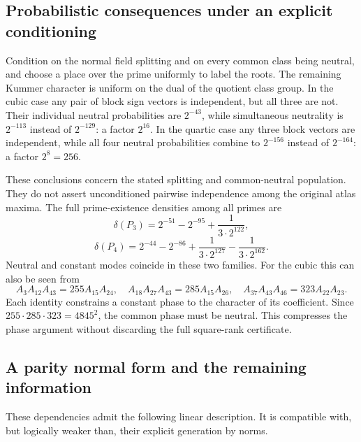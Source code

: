 \documentclass[11pt]{article}
\theoremstyle{definition}\newtheorem{definition}[theorem]{Definition}
\begin{document}
\subsection{Probabilistic consequences under an explicit conditioning}
Condition on the normal field splitting and on every common class
being neutral, and choose a place over the prime uniformly to label
the roots. The remaining Kummer character is uniform on the dual
of the quotient class group. In the cubic case any pair of
block sign vectors is independent, but all three are not. Their
individual neutral probabilities are $2^{-43}$, while simultaneous
neutrality is $2^{-113}$ instead of $2^{-129}$: a factor $2^{16}$.
In the quartic case any three block vectors are independent, while
all four neutral probabilities combine to $2^{-156}$ instead of
$2^{-164}$: a factor $2^8=256$.

These conclusions concern the stated splitting and common-neutral
population. They do not assert unconditioned pairwise independence
among the original atlas maxima. The full prime-existence densities
among all primes are
\[
 \delta(P_3)=2^{-51}-2^{-95}+\frac1{3\cdot2^{122}},
\]
\[
 \delta(P_4)=2^{-44}-2^{-86}
       +\frac1{3\cdot2^{127}}-\frac1{3\cdot2^{162}}.
\]
Neutral and constant modes coincide in these two families.
For the cubic this can also be seen from
\[
 A_3A_{12}A_{43}=255A_{15}A_{24},\quad
 A_{18}A_{27}A_{43}=285A_{15}A_{26},\quad
 A_{37}A_{43}A_{46}=323A_{22}A_{23}.
\]
Each identity constrains a constant phase to the character of its
coefficient. Since $255\cdot285\cdot323=4845^2$, the common phase
must be neutral. This compresses the phase argument without
discarding the full square-rank certificate.


\subsection{A parity normal form and the remaining information}
These dependencies admit the following linear description. It is
compatible with, but logically weaker than, their explicit generation
by norms.
\end{document}
